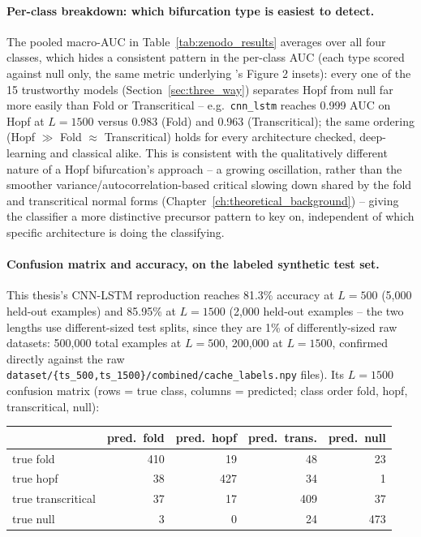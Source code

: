 \paragraph{Per-class breakdown: which bifurcation type is easiest to detect.} The pooled macro-AUC in Table~\ref{tab:zenodo_results} averages over all four classes, which hides a consistent pattern in the per-class AUC (each type scored against null only, the same metric underlying \citet{bury2021}'s Figure 2 insets): every one of the 15 trustworthy models (Section~\ref{sec:three_way}) separates Hopf from null far more easily than Fold or Transcritical -- e.g.\ \texttt{cnn\_lstm} reaches 0.999 AUC on Hopf at $L=1500$ versus 0.983 (Fold) and 0.963 (Transcritical); the same ordering (Hopf $\gg$ Fold $\approx$ Transcritical) holds for every architecture checked, deep-learning and classical alike. This is consistent with the qualitatively different nature of a Hopf bifurcation's approach -- a growing oscillation, rather than the smoother variance/autocorrelation-based critical slowing down shared by the fold and transcritical normal forms (Chapter~\ref{ch:theoretical_background}) -- giving the classifier a more distinctive precursor pattern to key on, independent of which specific architecture is doing the classifying.

\paragraph{Confusion matrix and accuracy, on the labeled synthetic test set.} This thesis's CNN-LSTM reproduction reaches 81.3\% accuracy at $L=500$ (5{,}000 held-out examples) and 85.95\% at $L=1500$ (2{,}000 held-out examples -- the two lengths use different-sized test splits, since they are 1\% of differently-sized raw datasets: 500{,}000 total examples at $L=500$, 200{,}000 at $L=1500$, confirmed directly against the raw \texttt{dataset/\{ts\_500,ts\_1500\}/combined/cache\_labels.npy} files). Its $L=1500$ confusion matrix (rows = true class, columns = predicted; class order fold, hopf, transcritical, null):

\begin{center}
\small
\begin{tabular}{lrrrr}
\toprule
 & pred.\ fold & pred.\ hopf & pred.\ trans. & pred.\ null \\
\midrule
true fold & 410 & 19 & 48 & 23 \\
true hopf & 38 & 427 & 34 & 1 \\
true transcritical & 37 & 17 & 409 & 37 \\
true null & 3 & 0 & 24 & 473 \\
\bottomrule
\end{tabular}
\end{center}

